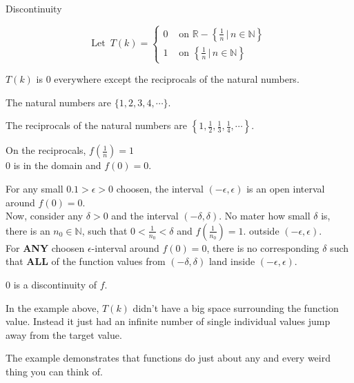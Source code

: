 \documentclass{ximera}
\begin{document}
\begin{example}  Discontinuity


\[
\text{Let } \, T(k) = 
\begin{cases}
  0 & \text{ on } \mathbb{R} - \left\{ \frac{1}{n} \, | \, n \in \mathbb{N}     \right\} \\
  1  & \text{ on } \left\{ \frac{1}{n} \, | \, n \in \mathbb{N}     \right\}
\end{cases}
\]

$T(k)$ is $0$ everywhere except the reciprocals of the natural numbers.

The natural numbers are $\{ 1, 2, 3, 4, \cdots \}$.

The reciprocals of the natural numbers are $\left\{ 1, \frac{1}{2}, \frac{1}{3}, \frac{1}{4}, \cdots \right\}$.

On the reciprocals, $f\left(\frac{1}{n}\right) = 1$ \\



$0$ is in the domain and $f(0) = 0$.

For any small $0.1 > \epsilon > 0$ choosen, the interval $(-\epsilon, \epsilon)$ is an open interval around $f(0) = 0$. \\



Now, consider any $\delta > 0$ and the interval $(-\delta, \delta)$. No mater how small $\delta$ is, there is an $n_0 \in \mathbb{N}$, such that $0 < \frac{1}{n_0} < \delta$ and $f\left(\frac{1}{n_0}\right) = 1$. outside $(-\epsilon, \epsilon)$. \\




For \textbf{\textcolor{red!50!blue!90!black}{ANY}} choosen $\epsilon$-interval around $f(0)= 0$, there is no corresponding $\delta$ such that \textbf{\textcolor{red!50!blue!90!black}{ALL}} of the function values from  $(-\delta, \delta)$ land inside $(-\epsilon, \epsilon)$.


$0$ is a discontinuity of $f$.


\end{example}






In the example above, $T(k)$ didn't have a big space surrounding the function value.  Instead it just had an infinite number of single individual values jump away from the target value.


The example demonstrates that functions do just about any and every weird thing you can think of.
\end{document}
